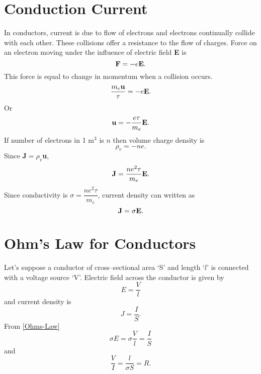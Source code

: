 \documentclass[12pt,a4paper]{article}
\begin{document}
\section{Conduction Current}
In conductors, current is due to flow of electrons and electrons continually collide with each other. These collisions offer a resistance to the flow of charges. Force on an electron moving under the influence of electric field \textbf{E} is
\begin{equation}
\mathrm{\textbf F}=-e\mathrm{\textbf E}.
\end{equation}
This force is equal to change in momentum when a collision occurs.
\begin{equation}
\dfrac{m_e\mathrm{\textbf u}}{\tau}=-e\mathrm{\textbf E}.
\end{equation}
Or
\begin{equation}
\mathrm{\textbf u}=-\dfrac{e\tau}{m_e}\mathrm{\textbf E}.
\end{equation}
If number of electrons in 1 m$^3$ is $n$ then volume charge density is
\begin{equation}
\rho_v=-ne.
\end{equation}
Since \textbf{J}$=\rho_v$\textbf{u},
\begin{equation}
\mathrm{\textbf J}=\dfrac{ne^2\tau}{m_e}\mathrm{\textbf E}.
\end{equation}
Since conductivity is $\sigma=\dfrac{ne^2\tau}{m_e}$, current density can written as
\begin{equation}
\mathrm{\textbf J}=\sigma\mathrm{\textbf E}.
\label{Ohms-Law}
\end{equation}
\section{Ohm's Law for Conductors}
Let's suppose a conductor of cross--sectional area `S' and length `$l$' is connected with a voltage source `V'. Electric field across the conductor is given by
\begin{equation}
E=\dfrac{V}{l}
\end{equation}
and current density is
\begin{equation}
J=\dfrac{I}{S}.
\end{equation}
From \ref{Ohms-Law}
\begin{equation}
\sigma E=\sigma\dfrac{V}{l}=\dfrac{I}{S}
\end{equation}
and
\begin{equation}
\dfrac{V}{I}=\dfrac{l}{\sigma S}=R.
\end{equation}
%
%
\end{document}
